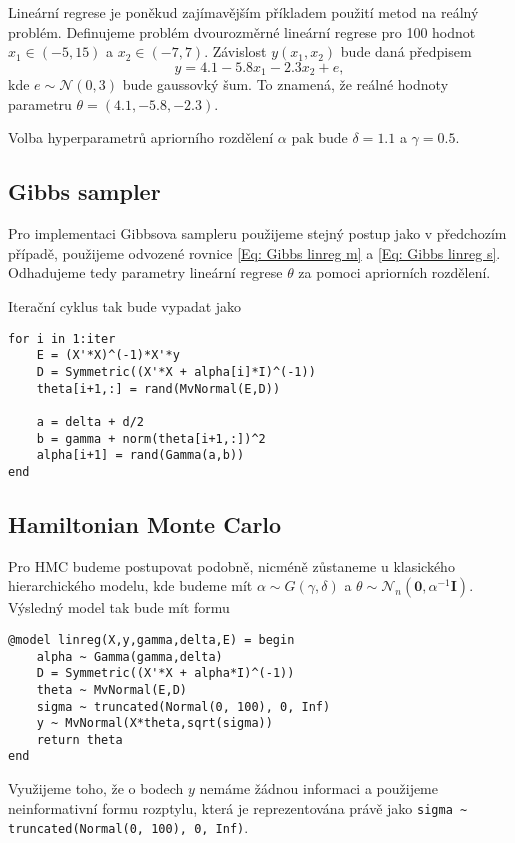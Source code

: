 \documentclass[11pt,oneside,american,czech]{article}
\newcommand{\N}{\mathcal{N}}
\begin{document}
Lineární regrese je poněkud zajímavějším příkladem použití metod na reálný problém. Definujeme problém dvourozměrné lineární regrese pro 100 hodnot $x_1 \in \left( -5,15 \right)$ a $x_2 \in \left( -7,7 \right)$. Závislost $y(x_1,x_2)$ bude daná předpisem
\begin{equation*}
	y = 4.1 - 5.8x_1 - 2.3x_2 + e,
\end{equation*}
kde $e \sim \mathcal{N}(0,3)$ bude gaussovký šum. To znamená, že reálné hodnoty parametru $\theta = \left( 4.1, -5.8, -2.3 \right)$.

Volba hyperparametrů apriorního rozdělení $\alpha$ pak bude $\delta = 1.1$ a $\gamma = 0.5$.

\subsection{Gibbs sampler}

Pro implementaci Gibbsova sampleru použijeme stejný postup jako v předchozím případě, použijeme odvozené rovnice \eqref{Eq: Gibbs linreg m} a \eqref{Eq: Gibbs linreg s}. Odhadujeme tedy parametry lineární regrese $\theta$ za pomoci apriorních rozdělení.

Iterační cyklus tak bude vypadat jako
\begin{lstlisting}
for i in 1:iter
	E = (X'*X)^(-1)*X'*y
	D = Symmetric((X'*X + alpha[i]*I)^(-1))
	theta[i+1,:] = rand(MvNormal(E,D))
	
	a = delta + d/2
	b = gamma + norm(theta[i+1,:])^2
	alpha[i+1] = rand(Gamma(a,b))
end
\end{lstlisting}

\subsection{Hamiltonian Monte Carlo}

Pro HMC budeme postupovat podobně, nicméně zůstaneme u klasického hierarchického modelu, kde budeme mít $\alpha \sim G(\gamma, \delta)$ a $\theta \sim \N_n(\boldsymbol{0},\alpha^{-1}\boldsymbol{I})$. Výsledný model tak bude mít formu

\begin{lstlisting}
@model linreg(X,y,gamma,delta,E) = begin
	alpha ~ Gamma(gamma,delta)
	D = Symmetric((X'*X + alpha*I)^(-1))
	theta ~ MvNormal(E,D)
	sigma ~ truncated(Normal(0, 100), 0, Inf)
	y ~ MvNormal(X*theta,sqrt(sigma))
	return theta
end
\end{lstlisting}

Využijeme toho, že o bodech $y$ nemáme žádnou informaci a použijeme neinformativní formu rozptylu, která je reprezentována právě jako \verb|sigma ~ truncated(Normal(0, 100), 0, Inf)|.
\end{document}
